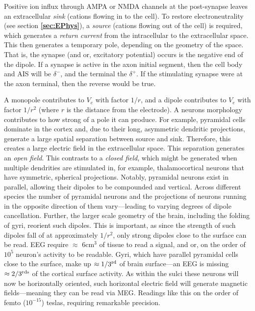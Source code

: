 Positive ion influx through AMPA or NMDA channels at the post-synapse leaves an extracellular \textit{sink} (cations flowing in to the cell). To restore electroneutrality (see section \textbf{\ref{sec:EPhys}}), a \textit{source} (cations flowing out of the cell) is required, which generates a \textit{return current} from the intracellular to the extracellular space. This then generates a temporary pole, depending on the geometry of the space. That is, the synapse (and or, excitatory potential) occurs is the negative end of the dipole. If a synapse is active in the axon initial segment, then the cell body and AIS will be $\delta^-$, and the terminal the $\delta^+$. If the stimulating synapse were at the axon terminal, then the reverse would be true.\newline

A monopole contributes to $V_e$ with factor $1/r$, and a dipole contributes to $V_e$ with factor $1/r^2$ (where $r$ is the distance from the electrode). A neurons morphology contributes to how strong of a pole it can produce. For example, pyramidal cells dominate in the cortex and, due to their long, asymmetric dendritic projections, generate a large spatial separation between source and sink. Therefore, this creates a large electric field in the extracellular space. This separation generates an \textit{open field}. This contrasts to a \textit{closed field}, which might be generated when multiple dendrities are stimulated in, for example, thalamocortical neurons that have symmetric, spherical projections. Notably, pyramidal neurons exist in parallel, allowing their dipoles to be compounded and vertical. Across different species the number of pyramidal neurons and the projections of neurons running in the opposite direction of them vary---leading to varying degrees of dipole cancellation. Further, the larger scale geometry of the brain, including the folding of gyri, reorient such dipoles. This is important, as since the strength of such dipoles fall of at approximately $1/r^2$, only strong dipoles close to the surface can be read. EEG require $\approx$ 6cm$^3$ of tissue to read a signal, and or, on the order of $10^5$ neuron's activity to be readable. Gyri, which have parallel pyramidal cells close to the surface, make up $\approx 1/3^{\rm rd}$ of brain surface---an EEG is missing $\approx 2/3^{\rm rds}$ of the cortical surface activity. As within the sulci these neurons will now be horizontally oriented, such horizontal electric field will generate magnetic fields---meaning they can be read via MEG. Readings like this on the order of femto ($10^{-15}$) teslas, requiring remarkable precision.\newline

